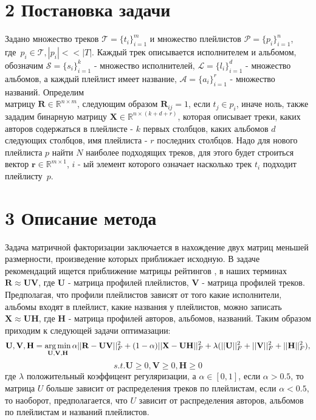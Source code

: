 \documentclass[12pt,twoside]{article}
\begin{document}
\section{2 Постановка задачи}

{Задано множество треков $\mathcal{T} = \{t_i\}_{i=1}^m$ и множество плейлистов $\mathcal{P} = \{p_i\}_{i=1}^{n}$, \\где~$p_i \in \mathcal{T}, |p_i| << |T|$. Каждый трек описывается исполнителем и альбомом, обозначим $\mathcal{S} = \{s_i\}_{i=1}^{k}$ - множество исполнителей, $\mathcal{L} = \{l_i\}_{i=1}^d$ - множество альбомов, а каждый плейлист имеет название, $\mathcal{A} = \{a_i\}_{i=1}^{r}$ - множество названий. Определим \\матрицу $\mathbf{R} \in \mathbb{R}^{n \times m}$, следующим образом $\mathbf{R}_{ij} = 1$, если $t_j \in p_i$, иначе ноль, также зададим бинарную матрицу $\mathbf{X} \in \mathbb{R}^{n \times (k + d + r)}$, которая описывает треки, каких авторов содержаться в плейлисте - $k$ первых столбцов, каких альбомов $d$ следующих столбцов, имя плейлиста - $r$ последних столбцов. Надо для нового плейлиста $p$ найти $N$ наиболее подходящих треков, для этого будет строиться вектор $\mathbf{r} \in \mathbb{R}^{m \times 1}$, $i$ - ый элемент которого означает насколько трек $t_i$ подходит плейлисту~$p$.}

\section{3 Описание метода}

{Задача матричной факторизации заключается в нахождение двух матриц меньшей размерности, произведение которых приближает исходную. В задаче рекомендаций ищется приближение матрицы рейтингов , в наших терминах  $\mathbf{R} \approx \mathbf{UV}$, где $\mathbf{U}$ - матрица профилей плейлистов, $\mathbf{V}$ - матрица профилей треков. Предполагая, что профили плейлистов зависят от того какие исполнители, альбомы входят в плейлист, какие названия у плейлистов, можно записать $\mathbf{X} \approx \mathbf{UH}$, где $\mathbf{H}$ - матрица профилей авторов, альбомов, названий. Таким образом приходим к следующей задачи оптимазации:
$$\mathbf{U, V, H} = \argmin_{\mathbf{U, V, H}}\alpha||\mathbf{R} - \mathbf{UV}||_F^2 +(1 - \alpha) ||\mathbf{X} - \mathbf{UH}||_F^2 + \lambda(||\mathbf{U}||_F^2 + ||\mathbf{V}||_F^2 + ||\mathbf{H}||_F^2),$$
$$ s.t. \mathbf{U} \geq 0,  \mathbf{V} \geq 0,  \mathbf{H} \geq 0$$
где $\lambda$ положительный коэффицент регуляризации, а $\alpha \in [0, 1]$, если $\alpha > 0.5$, то матрица $U$ больше зависит от распределения треков по плейлистам, если $\alpha < 0.5$, то наоборот, предполагается, что $U$ зависит от распределения авторов, альбомов по плейлистам и названий плейлистов. }
\end{document}
